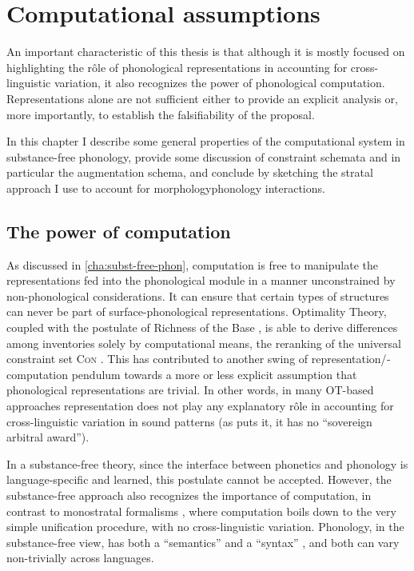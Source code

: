 \chapter{Computational assumptions}
\label{cha:comp-assumpt}

An important characteristic of this thesis is that although it is mostly focused on highlighting the rôle of phonological representations in accounting for cross\hyp linguistic variation, it also recognizes the power of phonological computation. Representations alone are not sufficient either to provide an explicit analysis or, more importantly, to establish the falsifiability of the proposal.

In this chapter I describe some general properties of the computational system in substance\hyp free phonology, provide some discussion of constraint schemata and in particular the augmentation schema, and conclude by sketching the stratal approach I use to account for morphology\endash phonology interactions.

\section{The power of computation}
\label{sec:power-computation}

As discussed in \cref{cha:subst-free-phon}, computation is free to manipulate the representations fed into the phonological module in a manner unconstrained by non\hyp phonological considerations. It can ensure that certain types of structures can never be part of surface\hyp phonological representations.  Optimality Theory, coupled with the postulate of Richness of the Base \citep{ot,mccarthy05:_colloq_arabic}, is able to derive differences among inventories solely by computational means, \ie the reranking of the universal constraint set \textsc{Con} \citep{kirchner97:_contr,flemming05:_deriv}. This has contributed to another swing of  representation\fshyp computation pendulum towards a more or less explicit assumption that phonological representations are trivial. In other words, in many OT\hyp based approaches representation does not play any explanatory rôle in accounting for cross\hyp linguistic variation in sound patterns (as \citealp{scheer11:_issues} puts it, it has no \enquote{sovereign arbitral award}).

In a substance\hyp free theory, since the interface between phonetics and phonology is language\hyp specific and learned, this postulate cannot be accepted. However, the substance\hyp free approach also recognizes the importance of computation, in contrast to monostratal formalisms \citep[\egm][]{bird-klein,bird1995,scobbie1997,ScobbieColemanBird,coleman98:_phonol,lodge93:_under,Lodge2003931,lodge07:_timin_icelan,lodge09:_fundam_concep_in_phonol}, where computation boils down to the very simple unification procedure, with no cross\hyp linguistic variation. Phonology, in the substance\hyp free view, has both a \enquote{semantics} \citep{pierrehumbert90:_phonol} and a \enquote{syntax} \citep{blaho-diss}, and both can vary non\hyp trivially across languages.

